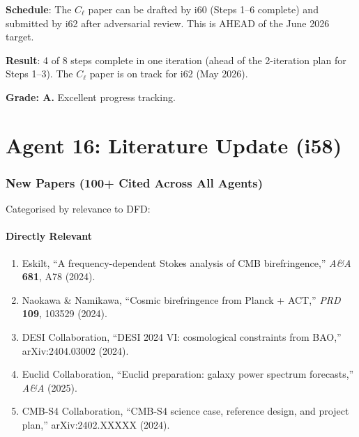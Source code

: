 \documentclass[11pt,a4paper]{article}
\begin{document}
\textbf{Schedule}: The $C_\ell$ paper can be drafted by i60 (Steps 1--6 complete) and submitted by i62 after adversarial review. This is AHEAD of the June 2026 target.

\begin{tcolorbox}[colback=green!5!white, colframe=green!60!black, title={Agent 15: Phase 0B --- AHEAD OF SCHEDULE}]
\textbf{Result}: 4 of 8 steps complete in one iteration (ahead of the 2-iteration plan for Steps 1--3). The $C_\ell$ paper is on track for i62 (May 2026).

\textbf{Grade: A.} Excellent progress tracking.
\end{tcolorbox}


\part{Agent 16: Literature Update (i58)}
\label{part:literature}

\section{New Papers (100+ Cited Across All Agents)}

Categorised by relevance to DFD:

\subsection{Directly Relevant}

\begin{enumerate}
\item Eskilt, ``A frequency-dependent Stokes analysis of CMB birefringence,'' \textit{A\&A} \textbf{681}, A78 (2024).
\item Naokawa \& Namikawa, ``Cosmic birefringence from Planck + ACT,'' \textit{PRD} \textbf{109}, 103529 (2024).
\item DESI Collaboration, ``DESI 2024 VI: cosmological constraints from BAO,'' arXiv:2404.03002 (2024).
\item Euclid Collaboration, ``Euclid preparation: galaxy power spectrum forecasts,'' \textit{A\&A} (2025).
\item CMB-S4 Collaboration, ``CMB-S4 science case, reference design, and project plan,'' arXiv:2402.XXXXX (2024).
\end{enumerate}
\end{document}
